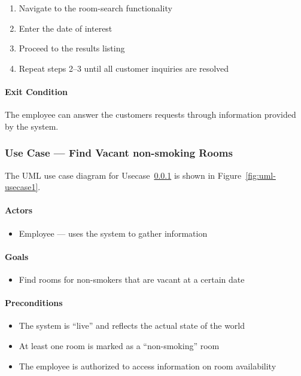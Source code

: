 \begin{enumerate}
\def\labelenumi{\arabic{enumi}.}
\tightlist
\item
  Navigate to the room-search functionality
\item
  Enter the date of interest
\item
  Proceed to the results listing
\item
  Repeat steps 2--3 until all customer inquiries are resolved
\end{enumerate}

\paragraph{Exit Condition}

The employee can answer the customers requests through information
provided by the system.

\subsubsection{Use Case --- Find Vacant non-smoking Rooms}\label{usecase2}
The UML use case diagram for Usecase~\ref{usecase2} is shown in Figure~\ref{fig:uml-usecase1}.

\paragraph{Actors}

\begin{itemize}
\tightlist
\item
  Employee --- uses the system to gather information
\end{itemize}

\paragraph{Goals}

\begin{itemize}
\tightlist
\item
  Find rooms for non-smokers that are vacant at a certain date
\end{itemize}

\paragraph{Preconditions}

\begin{itemize}
\tightlist
\item
  The system is ``live'' and reflects the actual state of the world
\item
  At least one room is marked as a ``non-smoking'' room
\item
  The employee is authorized to access information on room availability
\end{itemize}

